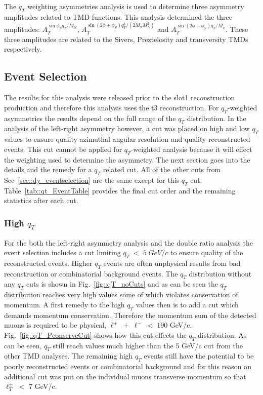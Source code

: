 The $q_T$ weighting asymmetries analysis is used to determine three asymmetry
amplitudes related to TMD functions.  This analysis determined the three
amplitudes: $A_T^{\sin\phi_S q_T/M_N}$, $A_T^{\sin(2\phi+\phi_S)
  q^3_T/(2M_{\pi}M_N^2)}$ and $A_T^{\sin(2\phi-\phi_S) q_T/M_{\pi}}$.  These
three amplitudes are related to the Sivers, Preztelosity and transversity TMDs
respectively.

\subsection{Event Selection}
The results for this analysis were released prior to the slot1 reconstruction
production and therefore this analysis uses the t3 reconstruction.  For
$q_T$-weighted asymmetries the results depend on the full range of the $q_T$
distribution.  In the analysis of the left-right asymmetry however, a cut was
placed on high and low $q_T$ values to ensure quality azimuthal angular
resolution and quality reconstructed events.  This cut cannot be applied for
$q_T$-weighted analysis because it will effect the weighting used to determine
the asymmetry.  The next section goes into the details and the remedy for a
$q_T$ related cut. All of the other cuts from Sec~\ref{sec::dy_eventselection}
are the same except for this $q_T$ cut. Table~\ref{tab::qt_EventTable} provides
the final cut order and the remaining statistics after each cut.

\subsubsection{High $q_T$} \label{sec::high_qt}
For the both the left-right asymmetry analysis and the double ratio analysis the
event selection includes a cut limiting $q_T\; < \;5\; GeV/c$ to ensure quality
of the reconstructed events.  Higher $q_T$ events are often unphysical results
from bad reconstruction or combinatorial background events.  The $q_T$
distribution without any $q_T$ cuts is shown in Fig.~\ref{fig::qT_noCuts} and as
can be seen the $q_T$ distribution reaches very high values some of which
violates conservation of momentum.  A first remedy to the high $q_T$ values then
is to add a cut which demands momentum conservation.  Therefore the momentum sum
of the detected muons is required to be physical, $\ell^+ \; + \; \ell^- \; < \;
190$ GeV/c.  Fig.~\ref{fig::qT_PconserveCut} shows how this cut effects the
$q_T$ distribution.  As can be seen, $q_T$ still reach values much higher than
the 5 GeV/c cut from the other TMD analyses.  The remaining high $q_T$ events
still have the potential to be poorly reconstructed events or combinatorial
background and for this reason an additional cut was put on the individual muons
transverse momentum so that $\ell_T^{\pm} \; <$ 7 GeV/c.

